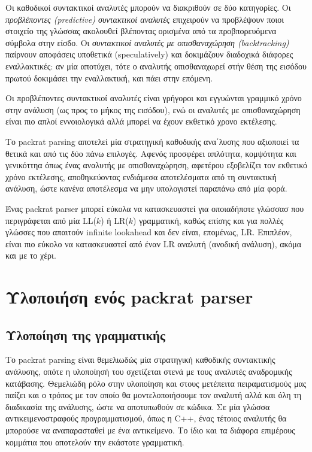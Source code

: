 \documentclass[diploma]{softlab-thesis}
\begin{document}
Οι καθοδικοί συντακτικοί αναλυτές μπορούν να διακριθούν σε δύο κατηγορίες. Οι \textit{προβλέποντες (predictive) συντακτικοί αναλυτές} επιχειρούν να προβλέψουν ποιοι στοιχείο της γλώσσας ακολουθεί βλέποντας ορισμένα από τα προβπορευόμενα σύμβολα στην είσδο.
Οι \textit{συντακτικοί αναλυτές με οπισθαναχώρηση (backtracking)} παίρνουν αποφάσεις υποθετικά (speculatively) και δοκιμάζουν διαδοχικά διάφορες εναλλακτικές: αν μία αποτύχει, τότε ο αναλυτής οπισθαναχωρεί στήν θέση της εισόδου πρωτού δοκιμάσει την εναλλακτική, και πάει στην επόμενη. 

Οι προβλέποντες συντακτικοί αναλυτές είναι γρήγοροι και εγγυώνται γραμμικό χρόνο στην ανάλυση (ως προς το μήκος της εισόδου), ενώ οι αναλυτές με οπισθαναχώρηση είναι πιο απλοί εννοιολογικά αλλά μπορεί να έχουν εκθετικό χρονο εκτέλεσης.

Το packrat parsing αποτελεί μία στρατηγική καθοδικής ανα΄λυσης που αξιοποιεί τα θετικά και από τις δύο πάνω επιλογές. 
Αφενός προσφέρει απλότητα, κομψότητα και γενικόττηα όπως ένας αναλυτής με οπισθαναχώρηση, αφετέρου εξοβελίζει τον εκθετικό χρόνο εκτέλεσης, αποθηκεύοντας ενδιάμεσα αποτελέσματα από τη συντακτική ανάλυση, ώστε κανένα αποτέλεσμα να μην υπολογιστεί παραπάνω από μία φορά.

Ένας packrat parser μπορεί εύκολα να κατασκευαστεί για οποιαδήποτε γλώσσασ που περιγράφεται από μία LL($k$) ή LR($k$) γραμματική, καθώς επίσης και για πολλές γλώσσες που απαιτούν infinite lookahead και δεν είναι, επομένως, LR.
Επιπλέον, είναι πιο εύκολο να κατασκευαστεί από έναν LR αναλυτή (ανοδική ανάλυση), ακόμα και με το χέρι.

\section{Υλοποιήση ενός packrat parser}

\subsection{Υλοποίηση της γραμματικής}
Το packrat parsing είναι θεμελιωδώς μία στρατηγική καθοδικής συντακτικής ανάλυσης, οπότε η υλοποίησή του σχετίζεται στενά με τους αναλυτές αναδρομικής κατάβασης. 
Θεμελιώδη ρόλο στην υλοποίηση και στους μετέπειτα πειραματισμούς μας παίζει και ο τρόπος με τον οποίο θα μοντελοποιήσουμε τον αναλυτή αλλά και όλη τη διαδικασία της ανάλυσης, ώστε να αποτυπωθούν σε κώδικα. 
Σε μία γλώσσα αντικειμενοστραφούς προγραμματισμού, όπως η C++, ένας τέτοιος αναλυτής θα μπορούσε να αναπαρασταθεί με ένα αντικείμενο. Το ίδιο και τα διάφορα επιμέρους κομμάτια που αποτελούν την εκάστοτε γραμματική. 
\end{document}
